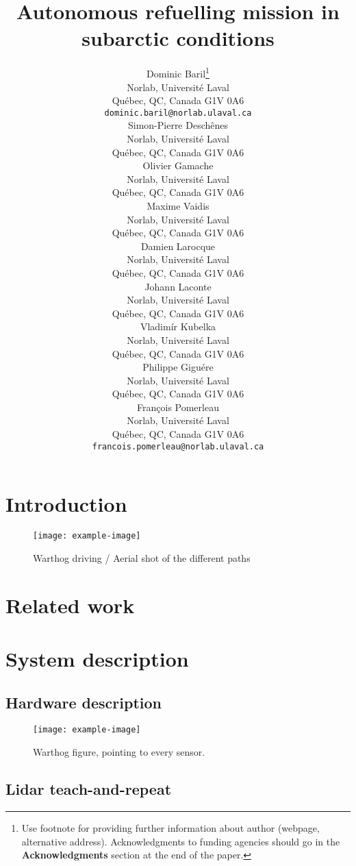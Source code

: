 \documentclass{article}
\title{Autonomous refuelling mission in subarctic conditions}
\author{
Dominic Baril\thanks{ Use footnote for providing further information
	about author (webpage, alternative address). Acknowledgments to
	funding agencies should go in the \textbf{Acknowledgments} section
	at the end of the paper.} \\
Norlab, Universit\'{e} Laval\\
Qu\'{e}bec, QC, Canada G1V 0A6 \\
\texttt{dominic.baril@norlab.ulaval.ca} \\
\And
Simon-Pierre Desch\^{e}nes \\
Norlab, Universit\'{e} Laval\\
Qu\'{e}bec, QC, Canada G1V 0A6 \\
\And
Olivier Gamache \\
Norlab, Universit\'{e} Laval\\
Qu\'{e}bec, QC, Canada G1V 0A6 \\
\And
Maxime Vaidis \\
Norlab, Universit\'{e} Laval\\
Qu\'{e}bec, QC, Canada G1V 0A6 \\
\And
Damien Larocque \\
Norlab, Universit\'{e} Laval\\
Qu\'{e}bec, QC, Canada G1V 0A6 \\
\And
Johann Laconte \\
Norlab, Universit\'{e} Laval\\
Qu\'{e}bec, QC, Canada G1V 0A6 \\
\And
Vladim\'{i}r Kubelka \\
Norlab, Universit\'{e} Laval\\
Qu\'{e}bec, QC, Canada G1V 0A6 \\
\And
Philippe Gigu\'{e}re \\
Norlab, Universit\'{e} Laval\\
Qu\'{e}bec, QC, Canada G1V 0A6 \\
\And
Fran\c{c}ois Pomerleau \\
Norlab, Universit\'{e} Laval\\
Qu\'{e}bec, QC, Canada G1V 0A6 \\
\texttt{francois.pomerleau@norlab.ulaval.ca} \\
}
\begin{document}
\maketitle

\begin{abstract}
\lightlipsum[1]
\end{abstract}

\section{Introduction}
\label{sec:intro}

\lightlipsum[1]
\cite{Pomerleau2014}

\begin{figure} [h]
	\centering
	\texttt{[image: example-image]}
	\caption{Warthog driving / Aerial shot of the different paths}
	\label{fig:front_fig}
\end{figure}

\lightlipsum[1]
\lightlipsum[1]
\lightlipsum[1]



\section{Related work}
\label{sec:rel_work}

\lightlipsum[1]
\lightlipsum[1]
\lightlipsum[1]

\section{System description}
\label{sec:sys}

\lightlipsum[1]


\subsection{Hardware description}
\label{sec:hardware}

\lightlipsum[1]

\begin{figure} [htpb]
	\centering
	\texttt{[image: example-image]}
	\caption{Warthog figure, pointing to every sensor.}
	\label{fig:warthog}
\end{figure}

\subsection{Lidar teach-and-repeat}
\label{sec:LTR}
\lightlipsum[1]
\end{document}
